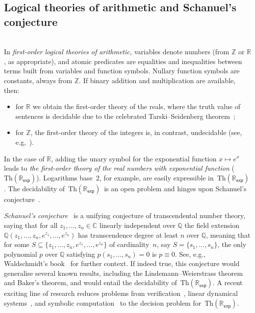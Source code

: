 \documentclass{lmcs}
\theoremstyle{plain}
\theoremstyle{definition}
\theoremstyle{remark}
\newcommand{\rexp}{$\mathrm{Th}(\mathbb R_{\mathsf{exp}})$}
\begin{document}
\subsection{Logical theories of arithmetic and Schanuel's conjecture}
\label{sec:logicaltheoriesschan}\mbox{}\\In \emph{first-order logical theories of arithmetic,}
variables denote numbers (from $\mathbb Z$ or $\mathbb R$, as appropriate),
and atomic predicates are equalities and inequalities between terms
built from variables and function symbols.
Nullary function symbols are constants, always from $\mathbb Z$.
If binary addition and multiplication are available, then:
\begin{itemize}
\item for $\mathbb R$
we obtain the first-order theory of the reals, where the truth value of
sentences is decidable due to the celebrated Tarski--Seidenberg theorem~\cite[Chapter~11 and Theorem~2.77]{BPR};
\item for $\mathbb Z$,
the first-order theory of the integers is, in contrast, undecidable
(see, e.g,~\cite{poonen2003hilbert}).
\end{itemize}
In the case of $\mathbb R$, adding the unary symbol for the exponential function
$x \mapsto e^x$ leads to
\emph{the first-order theory of the real numbers with exponential
function} (\rexp).
Logarithms base~2, for example, are easily expressible in~\rexp.
The decidability of~\rexp\ is an open problem
and hinges upon Schanuel's conjecture~\cite{macintyre1996decidability}.

\emph{Schanuel's conjecture}~\cite{lang1966introduction} is a unifying conjecture of
transcendental number theory, saying that for all $z_1,\dots,z_n \in \mathbb C$ linearly
independent over $\mathbb{Q}$ the field extension
$\mathbb{Q}(z_1,\dots,z_n,e^{z_1},\dots,e^{z_n})$ has  transcendence degree at
least $n$ over $\mathbb{Q}$,
meaning that for some $S \subseteq \{z_1, \dots, z_n,e^{z_1}, \dots, e^{z_n}\}$
of cardinality~$n$, say $S = \{s_1, \ldots, s_n\}$,
the only polynomial $p$ over $\mathbb Q$ satisfying
$p(s_1, \ldots, s_n) = 0$ is $p \equiv 0$. See, e.g., Waldschmidt's book~\cite[Section~1.4]{Waldschmidt00} for
  further context.
If indeed true, this conjecture would
generalise several known results, including the Lindemann--Weierstrass theorem
and Baker's theorem,
and would entail the decidability of~\rexp.
A recent exciting line of research
reduces problems from verification~\cite{DAVIAUD202178,Majumdar20}, linear dynamical systems~\cite{AlmagorCO018,ChonevOW16},
and symbolic computation~\cite{Huang18} to the decision problem for~\rexp.
\end{document}
